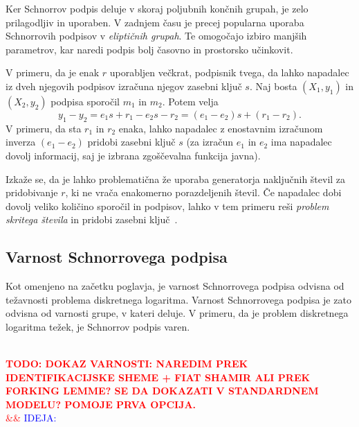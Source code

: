 \documentclass[isrm2, tisk]{fmfdelo}
\newcommand{\todo}[2][]{%
    \textcolor{red}{%
        \\ \textbf{\uppercase{todo: #2}}%
        \\%
        \ifx&#1&%
        \else%
            \textcolor{blue}{\uppercase{ideja:} #1}%
            \\%
        \fi%
    }%
}
\begin{document}
Ker Schnorrov podpis deluje v skoraj poljubnih končnih grupah, je zelo prilagodljiv in uporaben.
V zadnjem času je precej popularna uporaba Schnorrovih podpisov v \textit{eliptičnih grupah}.
Te omogočajo izbiro manjših parametrov, kar naredi podpis bolj časovno in prostorsko učinkovit.

\begin{opomba}
\label{opomba:nonce}
    V primeru, da je enak $r$ uporabljen večkrat, podpisnik tvega, da lahko napadalec iz dveh njegovih
    podpisov izračuna njegov zasebni ključ $s$. Naj bosta $(X_1, y_1)$ in $(X_2, y_2)$ podpisa sporočil
    $m_1$ in $m_2$. Potem velja
    $$
    y_1 - y_2 = e_1 s + r_1 - e_2 s - r_2 = (e_1 - e_2)s + (r_1 - r_2).
    $$
    V primeru, da sta $r_1$ in $r_2$ enaka, lahko napadalec z enostavnim izračunom inverza $(e_1 - e_2)$
    pridobi zasebni ključ $s$ (za izračun $e_1$ in $e_2$ ima napadalec dovolj informacij, saj je
    izbrana zgoščevalna funkcija javna). 

    Izkaže se, da je lahko problematična že uporaba generatorja naključnih števil za pridobivanje
    $r$, ki ne vrača enakomerno porazdeljenih števil. Če napadalec dobi dovolj veliko količino 
    sporočil in podpisov, lahko v tem primeru reši \textit{problem skritega števila} in pridobi 
    zasebni ključ~\cite{tibouchi2017attacks}.
\end{opomba}

\subsection{Varnost Schnorrovega podpisa}
Kot omenjeno na začetku poglavja, je varnost Schnorrovega podpisa odvisna od težavnosti problema
diskretnega logaritma. Varnost Schnorrovega podpisa je zato odvisna od varnosti grupe, v kateri deluje.
V primeru, da je problem diskretnega logaritma težek, je Schnorrov podpis varen.

\todo{dokaz varnosti: naredim prek identifikacijske sheme + fiat shamir ali prek forking lemme? 
se da dokazati v standardnem modelu? Pomoje prva opcija.}
\end{document}
